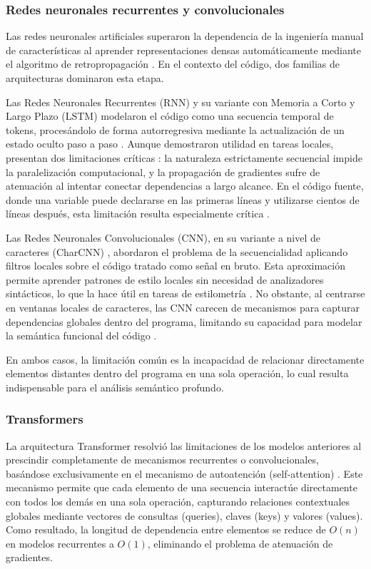 \subsubsection{Redes neuronales recurrentes y convolucionales}

Las redes neuronales artificiales superaron la dependencia de la ingeniería manual de 
características al aprender representaciones densas automáticamente mediante el 
algoritmo de retropropagación \cite{Alon2018Code2Vec}. En el contexto del código, 
dos familias de arquitecturas dominaron esta etapa.

Las Redes Neuronales Recurrentes (RNN) y su variante con Memoria a Corto y Largo 
Plazo (LSTM) modelaron el código como una secuencia temporal de tokens, procesándolo 
de forma autorregresiva mediante la actualización de un estado oculto paso a paso \cite{Chung2014Empirical}. 
Aunque demostraron utilidad en tareas locales, presentan dos limitaciones críticas : 
la naturaleza estrictamente secuencial impide la paralelización computacional, y la 
propagación de gradientes sufre de atenuación al intentar conectar dependencias a 
largo alcance. En el código fuente, donde una variable puede declararse en las 
primeras líneas y utilizarse cientos de líneas después, esta limitación resulta 
especialmente crítica \cite{Le2021DeepLearning, Chung2014Empirical}.

Las Redes Neuronales Convolucionales (CNN), en su variante a nivel de caracteres 
(CharCNN) \cite{Zhang2015CharCNN}, abordaron el problema de la secuencialidad aplicando filtros locales 
sobre el código tratado como señal en bruto. Esta aproximación permite aprender 
patrones de estilo locales sin necesidad de analizadores sintácticos, lo que la hace 
útil en tareas de estilometría \cite{Zhang2015CharCNN}. No obstante, al centrarse en ventanas locales de caracteres, las CNN carecen de mecanismos para capturar dependencias globales dentro 
del programa, limitando su capacidad para modelar la semántica funcional del código \cite{Le2021DeepLearning}.

En ambos casos, la limitación común es la incapacidad de relacionar directamente 
elementos distantes dentro del programa en una sola operación, lo cual resulta 
indispensable para el análisis semántico profundo.

\subsubsection{Transformers}

La arquitectura Transformer resolvió las limitaciones de los modelos anteriores al 
prescindir completamente de mecanismos recurrentes o convolucionales, basándose 
exclusivamente en el mecanismo de autoatención (self-attention) \cite{Vaswani2017Attention}. 
Este mecanismo permite que cada elemento de una secuencia interactúe directamente 
con todos los demás en una sola operación, capturando relaciones contextuales 
globales mediante vectores de consultas (queries), claves (keys) y valores (values). 
Como resultado, la longitud de dependencia entre elementos se reduce de $O(n)$ en 
modelos recurrentes a $O(1)$, eliminando el problema de atenuación de gradientes.


